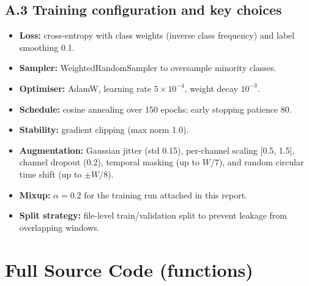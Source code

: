 \documentclass[10pt,a4paper,twocolumn]{article}
\begin{document}
\subsection*{A.3 Training configuration and key choices}
\begin{itemize}[leftmargin=1.2em]
\item \textbf{Loss:} cross-entropy with class weights (inverse class frequency) and label smoothing 0.1.
\item \textbf{Sampler:} WeightedRandomSampler to oversample minority classes.
\item \textbf{Optimiser:} AdamW, learning rate $5\times10^{-4}$, weight decay $10^{-3}$.
\item \textbf{Schedule:} cosine annealing over 150 epochs; early stopping patience 80.
\item \textbf{Stability:} gradient clipping (max norm 1.0).
\item \textbf{Augmentation:} Gaussian jitter (std 0.15), per-channel scaling [0.5, 1.5], channel dropout (0.2), temporal masking (up to $W/7$), and random circular time shift (up to $\pm W/8$).
\item \textbf{Mixup:} $\alpha=0.2$ for the training run attached in this report.
\item \textbf{Split strategy:} file-level train/validation split to prevent leakage from overlapping windows.
\end{itemize}

\section{Full Source Code (functions)}
\label{app:code}
\lstset{style=pythonstyle}

\end{document}
